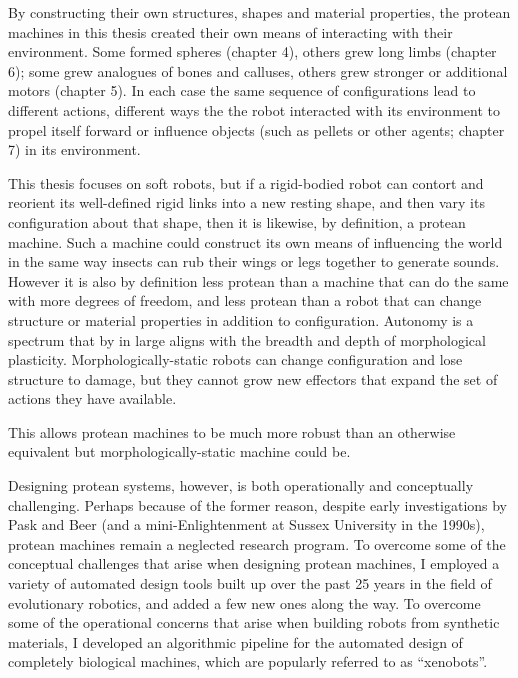 By constructing their own structures, shapes and material properties, 
the protean machines in this thesis created their own means of interacting with their environment.
Some formed spheres (chapter 4), others grew long limbs (chapter 6); 
some grew analogues of bones and calluses, others grew stronger or additional motors (chapter 5).
In each case the same sequence of configurations lead to different actions, different ways the the robot interacted with its environment to propel itself forward or influence objects (such as pellets or other agents; chapter 7) in its environment.

This thesis focuses on soft robots,
but if a rigid-bodied robot can contort and reorient its well-defined rigid links into a new resting shape, and then vary its configuration about that shape, then it is likewise, by definition, a protean machine.
Such a machine could construct its own means of influencing the world in the same way insects can rub their wings or legs together to generate sounds.
However it is also by definition less protean than a machine that can do the same with more degrees of freedom, and less protean than a robot that can change structure or material properties in addition to configuration.
Autonomy is a spectrum that by in large aligns with the breadth and depth of morphological plasticity.
Morphologically-static robots \cite{husbands1998better,floreano1996plastic,bongard2011morphological,bongard2006resilient,cully2015robots} can change configuration and lose structure to damage, but they cannot grow new effectors that expand the set of actions they have available.

This allows protean machines to be much more robust than an otherwise equivalent but morphologically-static machine could be.


Designing protean systems, however, is both operationally and conceptually challenging.
Perhaps because of the former reason, despite early investigations by Pask and Beer (and a mini-Enlightenment at Sussex University in the 1990s), protean machines remain a neglected research program.
To overcome some of the conceptual challenges that arise when designing protean machines,
I employed a variety of automated design tools built up over the past 25 years in the field of evolutionary robotics, and added a few new ones along the way.
To overcome some of the operational concerns that arise when building robots from synthetic materials,
I developed an algorithmic pipeline for the 
automated design of completely biological machines,
which are popularly referred to as ``xenobots''.


